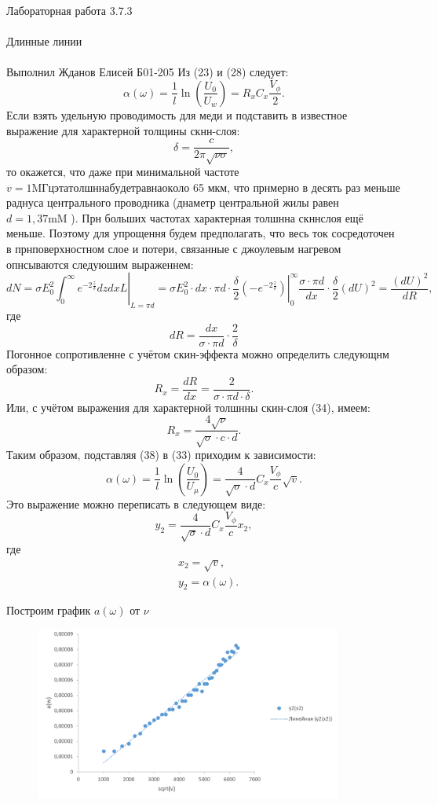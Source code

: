 \documentclass{astroedu-lab}
\begin{document}
\begin{problem}{\huge Лабораторная работа 3.7.3\\\\Длинные линии\\\\Выполнил Жданов Елисей Б01-205}
Из (23) и (28) следует:
$$
\alpha(\omega)=\frac{1}{l} \ln \left(\frac{U_0}{U_w}\right)=R_x C_x \frac{V_\phi}{2} .
$$
Если взять удельную проводимость для меди и подставить в известное выражение для характерной толщины скнн-слоя:
$$
\delta=\frac{c}{2 \pi \sqrt{\nu \sigma}},
$$
то окажется, что даже при минимальной частоте $v=1 \mathrm{MГц} \mathrm{эта} \mathrm{толшнна} \mathrm{будет} \mathrm{равна} \mathrm{около}$ 65 мкм, что прнмерно в десять раз меньше раднуса центрального проводника (днаметр центральной жилы равен $d=1,37 \mathrm{mM}$ ). Прн больших частотах характерная толшнна скннслоя ещё меньше. Поэтому для упрощення будем предполагать, что весь ток сосредоточен в прнповерхностном слое и потери, связанные с джоулевым нагревом опнсываются следуюшим выраженнем:
$$
d N=\left.\sigma E_0^2 \int_0^{\infty} e^{-2 \frac{z}{\delta}} d z d x L\right|_{L=\pi d}=\left.\sigma E_0^2 \cdot d x \cdot \pi d \cdot \frac{\delta}{2}\left(-e^{-2 \frac{z}{\delta}}\right)\right|_0 ^{\infty} \frac{\sigma \cdot \pi d}{d x} \cdot \frac{\delta}{2}(d U)^2=\frac{(d U)^2}{d R},
$$
где
$$
d R=\frac{d x}{\sigma \cdot \pi d} \cdot \frac{2}{\delta}
$$
Погонное сопротивленне с учётом скин-эффекта можно определить следующнм образом:
$$
R_x=\frac{d R}{d x}=\frac{2}{\sigma \cdot \pi d \cdot \delta} .
$$
Или, с учётом выражения для характерной толшнны скин-слоя (34), имеем:
$$
R_x=\frac{4 \sqrt{\nu}}{\sqrt{\sigma} \cdot c \cdot d} .
$$
Таким образом, подставляя (38) в (33) приходим к зависимости:
$$
\alpha(\omega)=\frac{1}{l} \ln \left(\frac{U_0}{U_\mu}\right)=\frac{4}{\sqrt{\sigma} \cdot d} C_x \frac{V_\phi}{c} \sqrt{v} .
$$
Это выражение можно переписать в следующем виде:
$$
y_2=\frac{4}{\sqrt{\sigma} \cdot d} C_x \frac{V_\phi}{c} x_2,
$$
где
$$
\begin{aligned}
& x_2=\sqrt{v}, \\
& y_2=\alpha(\omega) .
\end{aligned}
$$

\newpage

Построим график $a(\omega)$ от $\nu$

\begin{figure}[!h]
	\centering
	\includegraphics[width=0.9\textwidth]{граф2.png}
	\label{fig:boiler}
\end{figure}


\end{problem}
\end{document}
